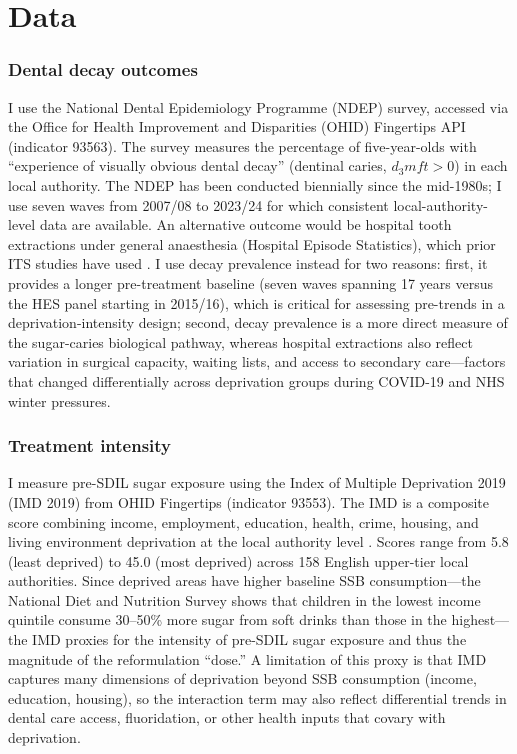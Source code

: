 \documentclass[12pt]{article}
\begin{document}
\section{Data}

\subsubsection*{Dental decay outcomes} I use the National Dental Epidemiology Programme (NDEP) survey, accessed via the Office for Health Improvement and Disparities (OHID) Fingertips API (indicator 93563). The survey measures the percentage of five-year-olds with ``experience of visually obvious dental decay'' (dentinal caries, $d_3mft > 0$) in each local authority. The NDEP has been conducted biennially since the mid-1980s; I use seven waves from 2007/08 to 2023/24 for which consistent local-authority-level data are available. An alternative outcome would be hospital tooth extractions under general anaesthesia (Hospital Episode Statistics), which prior ITS studies have used \citep{rogers2024sdil, sheringham2025sdil}. I use decay prevalence instead for two reasons: first, it provides a longer pre-treatment baseline (seven waves spanning 17 years versus the HES panel starting in 2015/16), which is critical for assessing pre-trends in a deprivation-intensity design; second, decay prevalence is a more direct measure of the sugar-caries biological pathway, whereas hospital extractions also reflect variation in surgical capacity, waiting lists, and access to secondary care---factors that changed differentially across deprivation groups during COVID-19 and NHS winter pressures.

\subsubsection*{Treatment intensity} I measure pre-SDIL sugar exposure using the Index of Multiple Deprivation 2019 (IMD 2019) from OHID Fingertips (indicator 93553). The IMD is a composite score combining income, employment, education, health, crime, housing, and living environment deprivation at the local authority level \citep{smith2020imd}. Scores range from 5.8 (least deprived) to 45.0 (most deprived) across 158 English upper-tier local authorities. Since deprived areas have higher baseline SSB consumption---the National Diet and Nutrition Survey shows that children in the lowest income quintile consume 30--50\% more sugar from soft drinks than those in the highest---the IMD proxies for the intensity of pre-SDIL sugar exposure and thus the magnitude of the reformulation ``dose.'' A limitation of this proxy is that IMD captures many dimensions of deprivation beyond SSB consumption (income, education, housing), so the interaction term may also reflect differential trends in dental care access, fluoridation, or other health inputs that covary with deprivation.
\end{document}
